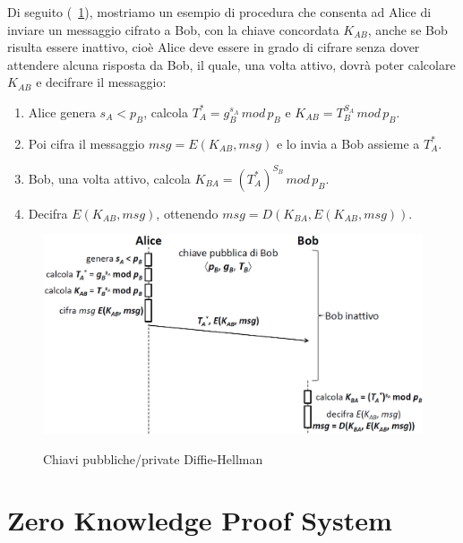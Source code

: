 Di seguito (\figurename~\ref{fig:authex}), mostriamo un esempio di procedura che consenta ad Alice di inviare un messaggio cifrato a Bob, con la chiave concordata $K_{AB}$, anche se Bob risulta essere inattivo, cioè Alice deve essere in grado di cifrare senza dover attendere alcuna risposta da Bob, il quale, una volta attivo, dovrà poter calcolare $K_{AB}$ e decifrare il messaggio:
\begin{enumerate}
\item Alice genera $s_{A}<p_{B}$, calcola $T_{A}^{*}=g_{B}^{s_{A}} \, mod \, p_{B}$ e $K_{AB}=T_{B}^{S_{A}} \, mod \, p_{B}$.
\item Poi cifra il messaggio $msg=E(K_{AB},msg)$ e lo invia a Bob assieme a $T_{A}^{*}$.
\item Bob, una volta attivo, calcola  $K_{BA}=(T_{A}^*)^{S_{B}} \, mod \, p_{B}$.
\item Decifra $E(K_{AB},msg)$, ottenendo $msg=D(K_{BA},E(K_{AB},msg))$.
\end{enumerate}
\begin{figure}[htbp]
	\centering%
	\subfigure%
	{\includegraphics[scale=0.6, keepaspectratio]{Immagini/chiave_pubblica/DiffieHellman_pubseckey.png}}
	\caption{Chiavi pubbliche/private Diffie-Hellman}
	\label{fig:authex}
\end{figure} 

\section{Zero Knowledge Proof System}

